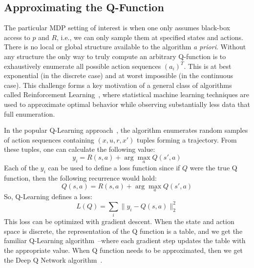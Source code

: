\subsection*{Approximating the Q-Function}
The particular MDP setting of interest is when one only assumes black-box access to $p$ and $R$, i.e., we can only sample them at specified states and actions. There is no local or global structure available to the algorithm \emph{a priori}. Without any structure the only way to truly compute an arbitrary Q-function is to exhaustively enumerate all possible action sequences $(a_i)^T$. This is at best exponential (in the discrete case) and at worst impossible (in the continuous case). This challenge forms a key motivation of a general class of algorithms called Reinforcement Learning~\cite{sutton1998reinforcement}, where statistical machine learning techniques are used to approximate optimal behavior while observing substantially less data that full enumeration. 

In the popular Q-Learning approach~\cite{sutton1998reinforcement}, the algorithm enumerates random samples of action sequences containing $(x,u,r, x')$ tuples forming a trajectory. From these tuples, one can calculate the following value:
\[
y_i = R(s,a) + \arg \max_{a} Q(s',a)
\]
Each of the $y_i$ can be used to define a loss function since if $Q$ were the true Q function, then the following recurrence would hold:
\[
Q(s,a) = R(s,a) + \arg \max_{a} Q(s',a)
\]
So, Q-Learning defines a loss:
\[
L(Q) = \sum_{i} \|y_i - Q(s,a)\|_2^2
\]
This loss can be optimized with gradient descent. When the state and action space is discrete, the representation of the Q function is a table, and we get the familiar Q-Learning algorithm~\cite{sutton1998reinforcement}--where each gradient step updates the table with the appropriate value. When Q function needs to be approximated, then we get the Deep Q Network algorithm~\cite{mnih2015human}.






